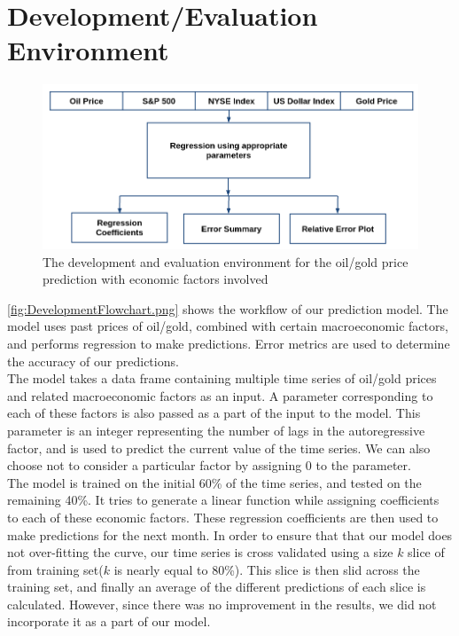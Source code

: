 \documentclass[runningheads]{llncs}
\begin{document}
\newpage
\section{Development/Evaluation Environment}

\begin{figure}
\centering
\includegraphics[width=\textwidth]{DevelopmentFlowchart.png}
\caption{The development and evaluation environment for the oil/gold price prediction with economic factors involved}
\label{fig:DevelopmentFlowchart.png}
\end{figure}

\noindent \autoref{fig:DevelopmentFlowchart.png} shows the workflow of our prediction model. The model uses past prices of oil/gold, combined with certain macroeconomic factors, and performs regression to make predictions. Error metrics are used to determine the accuracy of our predictions.\\

\noindent The model takes a data frame containing multiple time series of oil/gold prices and related macroeconomic factors as an input. A parameter corresponding to each of these factors is also passed as a part of the input to the model. This parameter is an integer representing the number of lags in the autoregressive factor, and is used to predict the current value of the time series. We can also choose not to consider a particular factor by assigning $0$ to the parameter.\\

\noindent The model is trained on the initial 60\% of the time series, and tested on the remaining 40\%. It tries to generate a linear function while assigning coefficients to each of these economic factors. These regression coefficients are then used to make predictions for the next month. In order to ensure that that our model does not over-fitting the curve, our time series is cross validated using a size $k$ slice of from training set($k$ is nearly equal to 80\%). This slice is then slid across the training set, and finally an average of the different predictions of each slice is calculated. However, since there was no improvement in the results, we did not incorporate it as a part of our model.\\
\end{document}
